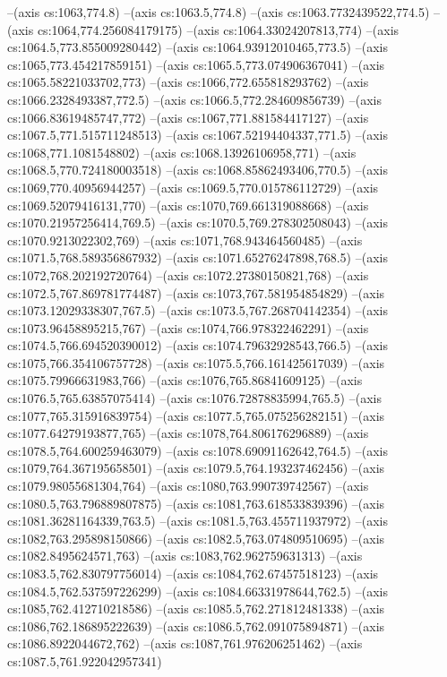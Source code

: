 --(axis cs:1063,774.8)
--(axis cs:1063.5,774.8)
--(axis cs:1063.7732439522,774.5)
--(axis cs:1064,774.256084179175)
--(axis cs:1064.33024207813,774)
--(axis cs:1064.5,773.855009280442)
--(axis cs:1064.93912010465,773.5)
--(axis cs:1065,773.454217859151)
--(axis cs:1065.5,773.074906367041)
--(axis cs:1065.58221033702,773)
--(axis cs:1066,772.655818293762)
--(axis cs:1066.2328493387,772.5)
--(axis cs:1066.5,772.284609856739)
--(axis cs:1066.83619485747,772)
--(axis cs:1067,771.881584417127)
--(axis cs:1067.5,771.515711248513)
--(axis cs:1067.52194404337,771.5)
--(axis cs:1068,771.1081548802)
--(axis cs:1068.13926106958,771)
--(axis cs:1068.5,770.724180003518)
--(axis cs:1068.85862493406,770.5)
--(axis cs:1069,770.40956944257)
--(axis cs:1069.5,770.015786112729)
--(axis cs:1069.52079416131,770)
--(axis cs:1070,769.661319088668)
--(axis cs:1070.21957256414,769.5)
--(axis cs:1070.5,769.278302508043)
--(axis cs:1070.9213022302,769)
--(axis cs:1071,768.943464560485)
--(axis cs:1071.5,768.589356867932)
--(axis cs:1071.65276247898,768.5)
--(axis cs:1072,768.202192720764)
--(axis cs:1072.27380150821,768)
--(axis cs:1072.5,767.869781774487)
--(axis cs:1073,767.581954854829)
--(axis cs:1073.12029338307,767.5)
--(axis cs:1073.5,767.268704142354)
--(axis cs:1073.96458895215,767)
--(axis cs:1074,766.978322462291)
--(axis cs:1074.5,766.694520390012)
--(axis cs:1074.79632928543,766.5)
--(axis cs:1075,766.354106757728)
--(axis cs:1075.5,766.161425617039)
--(axis cs:1075.79966631983,766)
--(axis cs:1076,765.86841609125)
--(axis cs:1076.5,765.63857075414)
--(axis cs:1076.72878835994,765.5)
--(axis cs:1077,765.315916839754)
--(axis cs:1077.5,765.075256282151)
--(axis cs:1077.64279193877,765)
--(axis cs:1078,764.806176296889)
--(axis cs:1078.5,764.600259463079)
--(axis cs:1078.69091162642,764.5)
--(axis cs:1079,764.367195658501)
--(axis cs:1079.5,764.193237462456)
--(axis cs:1079.98055681304,764)
--(axis cs:1080,763.990739742567)
--(axis cs:1080.5,763.796889807875)
--(axis cs:1081,763.618533839396)
--(axis cs:1081.36281164339,763.5)
--(axis cs:1081.5,763.455711937972)
--(axis cs:1082,763.295898150866)
--(axis cs:1082.5,763.074809510695)
--(axis cs:1082.8495624571,763)
--(axis cs:1083,762.962759631313)
--(axis cs:1083.5,762.830797756014)
--(axis cs:1084,762.67457518123)
--(axis cs:1084.5,762.537597226299)
--(axis cs:1084.66331978644,762.5)
--(axis cs:1085,762.412710218586)
--(axis cs:1085.5,762.271812481338)
--(axis cs:1086,762.186895222639)
--(axis cs:1086.5,762.091075894871)
--(axis cs:1086.8922044672,762)
--(axis cs:1087,761.976206251462)
--(axis cs:1087.5,761.922042957341)

